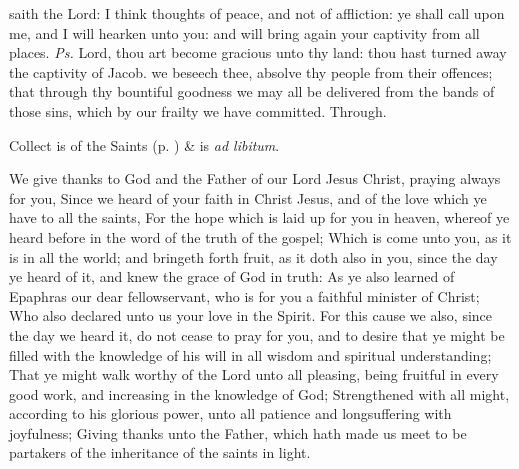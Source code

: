 \properantiphonfix

\introit
{} saith the Lord: I think thoughts of peace, and not of affliction: ye shall call upon me, and I will hearken unto you: and will bring again your captivity from all places. \textit{Ps.} Lord, thou art become gracious unto thy land: thou hast turned away the captivity of Jacob.
\collect
{} we beseech thee, absolve thy people from their offences; that through thy bountiful goodness we may all be delivered from the bands of those sins, which by our frailty we have committed. Through.
\begin{rubric}
     Collect is of the Saints (p. \pageref{SPSaints}) \&  is \emph{ad libitum}.
\end{rubric}

 We give thanks to God and the Father of our Lord Jesus Christ, praying always for you, Since we heard of your faith in Christ Jesus, and of the love which ye have to all the saints, For the hope which is laid up for you in heaven, whereof ye heard before in the word of the truth of the gospel; Which is come unto you, as it is in all the world; and bringeth forth fruit, as it doth also in you, since the day ye heard of it, and knew the grace of God in truth: As ye also learned of Epaphras our dear fellowservant, who is for you a faithful minister of Christ; Who also declared unto us your love in the Spirit. For this cause we also, since the day we heard it, do not cease to pray for you, and to desire that ye might be filled with the knowledge of his will in all wisdom and spiritual understanding; That ye might walk worthy of the Lord unto all pleasing, being fruitful in every good work, and increasing in the knowledge of God; Strengthened with all might, according to his glorious power, unto all patience and longsuffering with joyfulness; Giving thanks unto the Father, which hath made us meet to be partakers of the inheritance of the saints in light.


